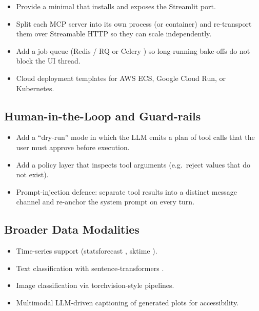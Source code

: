 \begin{itemize}[leftmargin=1.4em]
  \item \propd{} Provide a minimal  that installs
         and exposes the Streamlit port.
  \item \future{} Split each MCP server into its own process
        (or container) and re-transport them over Streamable HTTP
        \citep{mcpSpec2024} so they can scale independently.
  \item \future{} Add a job queue (Redis / RQ or Celery
        \citep{celery}) so long-running bake-offs do not block the
        UI thread.
  \item \future{} Cloud deployment templates for AWS ECS, Google
        Cloud Run, or Kubernetes.
\end{itemize}

\subsection{Human-in-the-Loop and Guard-rails}
\label{sec:future-hitl}

\begin{itemize}[leftmargin=1.4em]
  \item \propd{} Add a ``dry-run'' mode in which the LLM emits a
        plan of tool calls that the user must approve before
        execution.
  \item \propd{} Add a policy layer that inspects tool arguments
        (e.g.\ reject  values that do not
        exist).
  \item \future{} Prompt-injection defence: separate tool results
        into a distinct message channel and re-anchor the system
        prompt on every turn.
\end{itemize}

\subsection{Broader Data Modalities}
\label{sec:future-modality}

\begin{itemize}[leftmargin=1.4em]
  \item \future{} Time-series support (statsforecast
        \citep{statsforecast}, sktime \citep{sktime}).
  \item \future{} Text classification with sentence-transformers
        \citep{reimers2019sbert}.
  \item \future{} Image classification via torchvision-style
        pipelines.
  \item \future{} Multimodal LLM-driven captioning of generated
        plots for accessibility.
\end{itemize}

